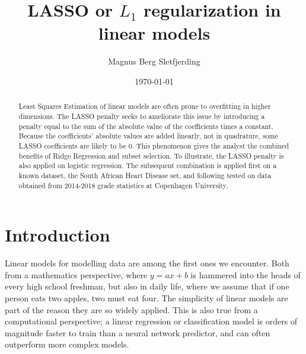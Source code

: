 \documentclass[%
 reprint,
 amsmath,amssymb,
 aps,
]{revtex4-1}
\begin{document}

\title{LASSO or $L_1$ regularization in linear models}%

\author{Magnus Berg Sletfjerding}

%

\date{\today}%

\begin{abstract}
  Least Squares Estimation of linear models are often prone to overfitting in higher dimensions.
  The LASSO penalty seeks to ameliorate this issue by introducing a penalty equal to the sum of the absolute value of the coefficients times a constant.
  Because the coefficients' absolute values are added linearly, not in quadrature, some LASSO coefficients are likely to be 0.
  This phenomenon gives the analyst the combined benefits of Ridge Regression and subset selection.
  To illustrate, the LASSO penalty is also applied on logistic regression.
  The subsequent combination is applied first on a known dataset, the South African Heart Disease set, and following tested on data obtained from 2014-2018 grade statistics at Copenhagen University.
\end{abstract}

\maketitle

\section{Introduction}

Linear models for modelling data are among the first ones we encounter.
Both from a mathematics perspective, where $y = ax + b$ is hammered into the heads of every high school freshman, but also in daily life, where we assume that if one person eats two apples, two must eat four.\cite{sterling_1001_2013} %
The simplicity of linear models are part of the reason they are so widely applied.
This is also true from a computational perspective; a linear regression or classification model is orders of magnitude faster to train than a neural network predictor, and can often outperform more complex models. \cite{hastie_elements_2017}
\end{document}

